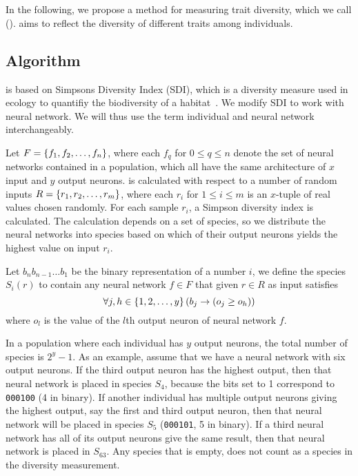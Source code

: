 \section{\di{}}\label{sec:nntd}
In the following, we propose a method for measuring trait diversity, which we call \emph{\di{}} (\dia). \dia{} aims to reflect the diversity of different traits among individuals. 

\subsection{Algorithm}
\dia{} is based on Simpsons Diversity Index (SDI), which is a diversity measure used in ecology to quantifiy the biodiversity of a habitat~\cite{simpson1949measurement}. We modify SDI to work with neural network. We will thus use the term individual and neural network interchangeably.

Let $F = \left\{ f_1, f_2, \dots, f_n \right\}$, where each $f_q$ for $0 \leq q \leq n$ denote the set of neural networks contained in a population, which all have the same architecture of $x$ input and $y$ output neurons. \dia{} is calculated with respect to a number of random inputs $R = \left\{ r_1, r_2, \dots, r_m \right\}$, where each $r_i$ for $1 \leq i \leq m$ is an $x$-tuple of real values chosen randomly. For each sample $r_i$, a Simpson diversity index is calculated. The calculation depends on a set of species, so we distribute the neural networks into species based on which of their output neurons yields the highest value on input $r_i$. 

Let $b_{n}b_{n-1}\dots b_1$ be the binary representation of a number $i$,
we define the species $S_i(r)$ to contain any neural network $f \in F$ that given $r \in R$ as input satisfies
%
\[
  \forall j, h \in \left\{ 1,2,\dots,y \right\} \left(b_j \rightarrow \left(o_j \geq o_h\right)\right)
\]
%
where $o_l$ is the value of the $l$th output neuron of neural network $f$.

In a population where each individual has $y$ output neurons, the total number of species is $2^y - 1$.  As an example, assume that we have a neural network with six output neurons. If the third output neuron has the highest output, then that neural network is placed in species $S_4$, because the bits set to 1 correspond to \texttt{000100} (4 in binary). If another individual has multiple output neurons giving the highest output, say the first and third output neuron, then that neural network will be placed in species $S_5$ (\texttt{000101}, 5 in binary). If a third neural network has all of its output neurons give the same result, then that neural network is placed in $S_{63}$. Any species that is empty, does not count as a species in the diversity measurement.

